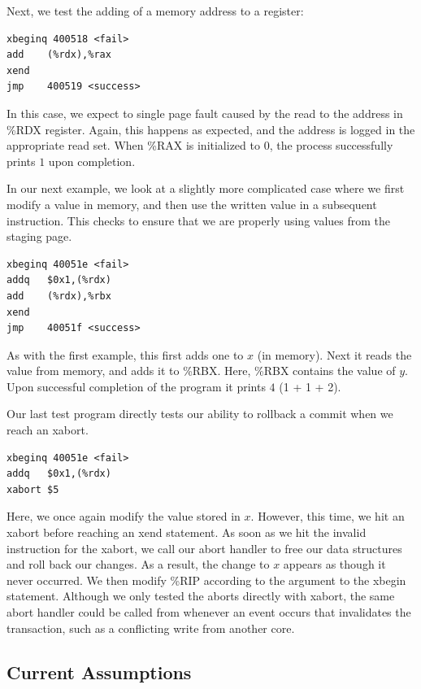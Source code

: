 \documentclass{acm_proc_article-sp}
\begin{document}
Next, we test the adding of a memory address to a register:

\begin{verbatim}
xbeginq 400518 <fail>
add    (%rdx),%rax
xend   
jmp    400519 <success>
\end{verbatim}

In this case, we expect to single page fault caused by the read to the address
in \%RDX register. Again, this happens as expected, and the address is logged
in the appropriate read set. When \%RAX is initialized to 0, the process 
successfully prints $1$ upon completion.


In our next example, we look at a slightly more complicated case where we first
modify a value in memory, and then use the written value in a subsequent
instruction. This checks to ensure that we are properly using values from the
staging page. 

\begin{verbatim}
xbeginq 40051e <fail>
addq   $0x1,(%rdx)
add    (%rdx),%rbx
xend   
jmp    40051f <success>
\end{verbatim}

As with the first example, this first adds one to $x$ (in memory). Next it
reads the value from memory, and adds it to \%RBX. Here, \%RBX contains the
value of $y$.  Upon successful completion of the program it prints $4$ ({1 + 1
+ 2}).


Our last test program directly tests our ability to rollback a commit when we
reach an xabort.

\begin{verbatim}
xbeginq 40051e <fail>
addq   $0x1,(%rdx)
xabort $5
\end{verbatim}

Here, we once again modify the value stored in $x$. However, this time, we hit
an xabort before reaching an xend statement.  As soon as we hit the invalid
instruction for the xabort, we call our abort handler to free our data
structures and roll back our changes. As a result, the change to $x$ appears as
though it never occurred. We then modify \%RIP according to the argument to the
xbegin statement. Although we only tested the aborts directly with xabort, the
same abort handler could be called from whenever an event occurs that
invalidates the transaction, such as a conflicting write from another core.

\subsection{Current Assumptions}
\end{document}
